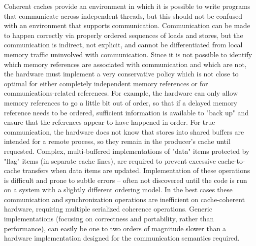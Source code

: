 Coherent caches provide an environment in which it is possible to write
programs that communicate across independent threads, but this should
not be confused with an environment that supports communication.
Communication can be made to happen correctly via properly ordered 
sequences of loads and stores, but the communication is indirect, not 
explicit, and cannot be differentiated from local memory traffic uninvolved
with communication.  Since it is not possible to identify which memory references
are associated with communication and which are not, the hardware must implement
a very conservative policy which is not close to optimal for either completely 
independent memory references or for communications-related references.
For example, the hardware can only allow memory references to go a little bit
out of order, so that if a delayed memory reference needs to be ordered, sufficient
information is available to "back up" and ensure that the references appear to 
have happened in order.  For true communication, the hardware does not know 
that stores into shared buffers are intended for a remote process, so they remain
in the producer's cache until requested.  Complex, multi-buffered implementations
of "data" items protected by "flag" items (in separate cache lines), are required to 
prevent excessive cache-to-cache transfers when data items are updated.
Implementation of these operations is difficult and prone to subtle errors -- often 
not discovered until the code is run on a system with a slightly different ordering
model.  In the best cases these communication and synchronization operations
are inefficient on cache-coherent hardware, requiring multiple serialized coherence 
operations.  Generic implementations (focusing on correctness and portability, rather 
than performance), can easily be one to two orders of magnitude slower than a 
hardware implementation designed for the communication semantics required.

